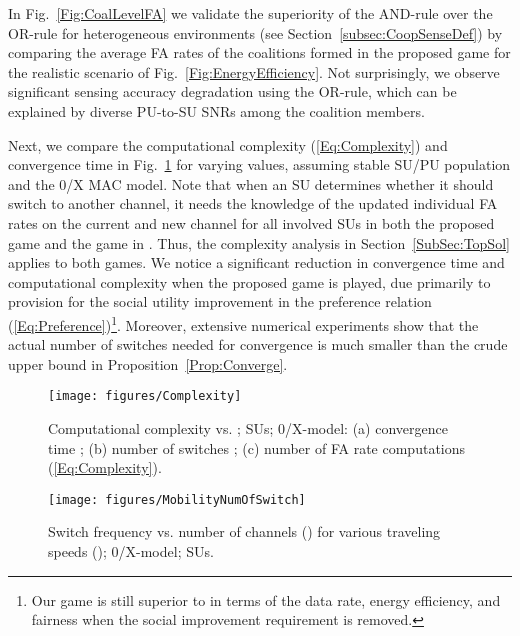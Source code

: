 \documentclass[journal,draftclsnofoot,onecolumn]{IEEEtran}
\theoremstyle{definition}
\newif\ifdoublecolumn
\def\FigScale{0.6}
\def\FigScale{0.65}
\begin{document}
\ifdoublecolumn
\begin{figure*}
\normalsize

\hrulefill
\vspace*{-10.2pt}
\label{Fig:Eq:NegExternalityBeforeAfter}
\end{figure*}
\fi

In Fig.~\ref{Fig:CoalLevelFA} we validate the superiority of the AND-rule over the OR-rule for heterogeneous environments (see Section~\ref{subsec:CoopSenseDef}) by comparing the average FA rates of the coalitions formed in the proposed game for the realistic scenario of Fig.~\ref{Fig:EnergyEfficiency}. Not surprisingly, we observe significant sensing accuracy degradation using the OR-rule, which can be explained by diverse PU-to-SU SNRs among the coalition members.


Next, we compare the computational complexity (\ref{Eq:Complexity}) and convergence time in Fig.~\ref{Fig:Complexity} for varying  values, assuming stable SU/PU population and the 0/X MAC model. Note that when an SU determines whether it should switch to another channel, it needs the knowledge of the updated individual FA rates on the current and new channel for all involved SUs in both the proposed game and the game in \cite{HedonicSenseGame}. Thus, the complexity analysis in Section~\ref{SubSec:TopSol} applies to both games. We notice a significant reduction in convergence time and computational complexity when the proposed game is played, due primarily to provision for the social utility improvement in the preference relation (\ref{Eq:Preference})\footnote{Our game is still superior to \cite{HedonicSenseGame} in terms of the data rate, energy efficiency, and fairness when the social improvement requirement is removed.}. Moreover, extensive numerical experiments show that the actual number of switches needed for convergence is much smaller than the crude upper bound in Proposition~\ref{Prop:Converge}.

\begin{figure}[!t]
    \centering
    \texttt{[image: figures/Complexity]}
    \caption{Computational complexity vs. ;  SUs; 0/X-model: (a) convergence time ; (b) number of switches ; (c) number of FA rate computations (\ref{Eq:Complexity}).}
    \label{Fig:Complexity}
\end{figure}

\begin{figure}[!t]
    \centering
    \texttt{[image: figures/MobilityNumOfSwitch]}
    \caption{Switch frequency vs. number of channels () for various traveling speeds (); 0/X-model;  SUs.}
    \label{fig:MobilityNumOfSwitch}
\end{figure}
\end{document}
